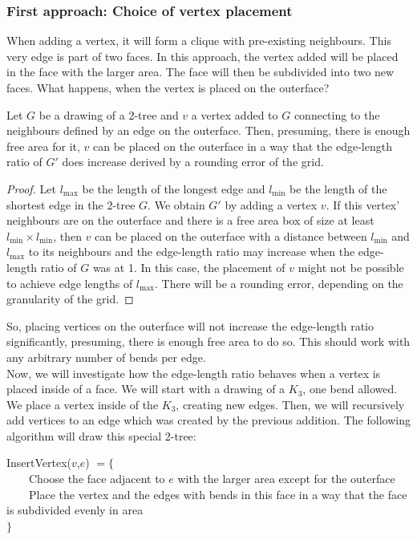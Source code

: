 \subsubsection{First approach: Choice of vertex placement}
When adding a vertex, it will form a clique with pre-existing neighbours. This very edge is part of two faces. In this approach, the vertex added will be placed in the face with the larger area. The face will then be subdivided into two new faces. What happens, when the vertex is placed on the outerface?
\begin{lemma}
	Let $G$ be a drawing of a 2-tree and $v$ a vertex added to $G$ connecting to the neighbours defined by an edge on the outerface. Then, presuming, there is enough free area for it, $v$ can be placed on the outerface in a way that the edge-length ratio of $G'$ does increase derived by a rounding error of the grid.
\end{lemma}
\begin{proof}
	Let $l_{\max}$ be the length of the longest edge and $l_{\min}$ be the length of the shortest edge in the 2-tree $G$. We obtain $G'$ by adding a vertex $v$. If this vertex' neighbours are on the outerface and there is a free area box of size at least $l_{\min}\times l_{\min}$, then $v$ can be placed on the outerface with a distance between $l_{\min}$ and $l_{\max}$ to its neighbours and the edge-length ratio may increase when the edge-length ratio of $G$ was at 1. In this case, the placement of $v$ might not be possible to achieve edge lengths of $l_{\max}$. There will be a rounding error, depending on the granularity of the grid.
\end{proof}
So, placing vertices on the outerface will not increase the edge-length ratio significantly, presuming, there is enough free area to do so. This should work with any arbitrary number of bends per edge.\\
Now, we will investigate how the edge-length ratio behaves when a vertex is placed inside of a face. We will start with a drawing of a $K_3$, one bend allowed. We place a vertex inside of the $K_3$, creating new edges. Then, we will recursively add vertices to an edge which was created by the previous addition. The following algorithm will draw this special 2-tree:\\
\begin{algorithm}[H]
	InsertVertex($v$,$e$) $= \{$\\
	~~~~Choose the face adjacent to $e$ with the larger area except for the outerface\\
	~~~~Place the vertex and the edges with bends in this face in a way that the face is subdivided evenly in area\\
	$\}$
\end{algorithm}
